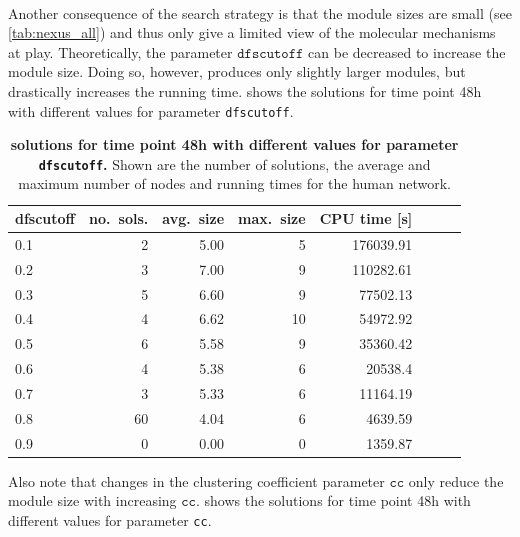\paragraph{}
Another consequence of the \nexus{} search strategy is that the module sizes are small (see \cref{tab:nexus_all}) and thus only give a limited view of the molecular mechanisms at play.
Theoretically, the parameter $\mathtt{dfscutoff}$ can be decreased to increase the module size.
Doing so, however, produces only slightly larger modules, but drastically increases the running time.
 shows the \nexus{} solutions for time point \unit{48}{h} with different values for parameter \texttt{dfscutoff}.

\begin{table}[h]
	\caption[\nexus{} solutions for time point \unit{48}{h} with different values for parameter \texttt{dfscutoff}.]{\textbf{\nexus{} solutions for time point \unit{48}{h} with
    different values for parameter \texttt{dfscutoff}.} Shown are  the number of solutions, the average and maximum number of nodes and running times for the human network.}
\begin{center}
\tabcolsep=0.08cm
\begin{tabular}{lrrrrrrr}
\hline
dfscutoff & no.\ sols. & avg.\ size & max.\ size& CPU time [s] \\ \hline
0.1 & 2 & 5.00 & 5 & 176039.91\\
0.2 & 3 & 7.00 & 9 & 110282.61\\
0.3 & 5 & 6.60 & 9 & 77502.13\\
0.4 & 4 & 6.62 & 10 & 54972.92\\
0.5 & 6 & 5.58 & 9 & 35360.42\\
0.6 & 4 & 5.38 & 6 & 20538.4\\
0.7 & 3 & 5.33 & 6 & 11164.19\\
0.8 & 60 & 4.04 & 6 & 4639.59\\
0.9 & 0 & 0.00 & 0 & 1359.87\\ \hline
\end{tabular}
\end{center}
\label{tab:dfs}
\end{table}


Also note that changes in the clustering coefficient parameter $\mathtt{cc}$ only reduce the module size with increasing $\mathtt{cc}$.
 shows the \nexus{} solutions for time point \unit{48}{h} with different values for parameter \texttt{cc}.

